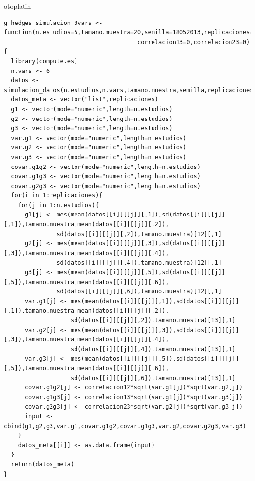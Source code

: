 otoplatin\documentclass[a4paper,openright,12pt]{report}
\begin{document}
{\begin{verbatim}
g_hedges_simulacion_3vars <- function(n.estudios=5,tamano.muestra=20,semilla=18052013,replicaciones=5,correlacion12=0,
                                      correlacion13=0,correlacion23=0){
  library(compute.es)
  n.vars <- 6
  datos <- simulacion_datos(n.estudios,n.vars,tamano.muestra,semilla,replicaciones)
  datos_meta <- vector("list",replicaciones)
  g1 <- vector(mode="numeric",length=n.estudios)
  g2 <- vector(mode="numeric",length=n.estudios)
  g3 <- vector(mode="numeric",length=n.estudios)
  var.g1 <- vector(mode="numeric",length=n.estudios)
  var.g2 <- vector(mode="numeric",length=n.estudios)
  var.g3 <- vector(mode="numeric",length=n.estudios)
  covar.g1g2 <- vector(mode="numeric",length=n.estudios) 
  covar.g1g3 <- vector(mode="numeric",length=n.estudios)
  covar.g2g3 <- vector(mode="numeric",length=n.estudios)
  for(i in 1:replicaciones){
    for(j in 1:n.estudios){
      g1[j] <- mes(mean(datos[[i]][[j]][,1]),sd(datos[[i]][[j]][,1]),tamano.muestra,mean(datos[[i]][[j]][,2]),
               sd(datos[[i]][[j]][,2]),tamano.muestra)[12][,1]
      g2[j] <- mes(mean(datos[[i]][[j]][,3]),sd(datos[[i]][[j]][,3]),tamano.muestra,mean(datos[[i]][[j]][,4]),
               sd(datos[[i]][[j]][,4]),tamano.muestra)[12][,1]
      g3[j] <- mes(mean(datos[[i]][[j]][,5]),sd(datos[[i]][[j]][,5]),tamano.muestra,mean(datos[[i]][[j]][,6]),
               sd(datos[[i]][[j]][,6]),tamano.muestra)[12][,1]
      var.g1[j] <- mes(mean(datos[[i]][[j]][,1]),sd(datos[[i]][[j]][,1]),tamano.muestra,mean(datos[[i]][[j]][,2]),
                   sd(datos[[i]][[j]][,2]),tamano.muestra)[13][,1]
      var.g2[j] <- mes(mean(datos[[i]][[j]][,3]),sd(datos[[i]][[j]][,3]),tamano.muestra,mean(datos[[i]][[j]][,4]),
                   sd(datos[[i]][[j]][,4]),tamano.muestra)[13][,1]
      var.g3[j] <- mes(mean(datos[[i]][[j]][,5]),sd(datos[[i]][[j]][,5]),tamano.muestra,mean(datos[[i]][[j]][,6]),
                   sd(datos[[i]][[j]][,6]),tamano.muestra)[13][,1]
      covar.g1g2[j] <- correlacion12*sqrt(var.g1[j])*sqrt(var.g2[j])
      covar.g1g3[j] <- correlacion13*sqrt(var.g1[j])*sqrt(var.g3[j])
      covar.g2g3[j] <- correlacion23*sqrt(var.g2[j])*sqrt(var.g3[j])
      input <- cbind(g1,g2,g3,var.g1,covar.g1g2,covar.g1g3,var.g2,covar.g2g3,var.g3)
    }
    datos_meta[[i]] <- as.data.frame(input)
  }
  return(datos_meta)
}
\end{verbatim}}
\newpage
\end{document}

